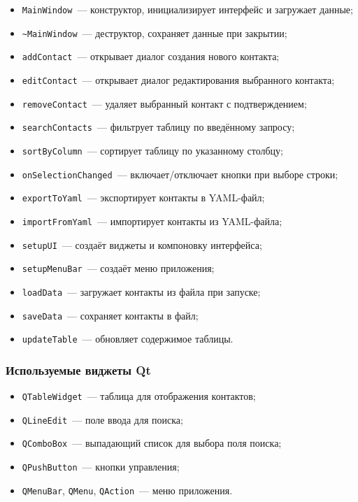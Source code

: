 \begin{itemize}
    \item \texttt{MainWindow}~--- конструктор, инициализирует интерфейс и загружает данные;
    \item \texttt{\textasciitilde MainWindow}~--- деструктор, сохраняет данные при закрытии;
    \item \texttt{addContact}~--- открывает диалог создания нового контакта;
    \item \texttt{editContact}~--- открывает диалог редактирования выбранного контакта;
    \item \texttt{removeContact}~--- удаляет выбранный контакт с подтверждением;
    \item \texttt{searchContacts}~--- фильтрует таблицу по введённому запросу;
    \item \texttt{sortByColumn}~--- сортирует таблицу по указанному столбцу;
    \item \texttt{onSelectionChanged}~--- включает/отключает кнопки при выборе строки;
    \item \texttt{exportToYaml}~--- экспортирует контакты в YAML-файл;
    \item \texttt{importFromYaml}~--- импортирует контакты из YAML-файла;
    \item \texttt{setupUI}~--- создаёт виджеты и компоновку интерфейса;
    \item \texttt{setupMenuBar}~--- создаёт меню приложения;
    \item \texttt{loadData}~--- загружает контакты из файла при запуске;
    \item \texttt{saveData}~--- сохраняет контакты в файл;
    \item \texttt{updateTable}~--- обновляет содержимое таблицы.
\end{itemize}

\subsubsection*{Используемые виджеты Qt}

\begin{itemize}
    \item \texttt{QTableWidget}~--- таблица для отображения контактов;
    \item \texttt{QLineEdit}~--- поле ввода для поиска;
    \item \texttt{QComboBox}~--- выпадающий список для выбора поля поиска;
    \item \texttt{QPushButton}~--- кнопки управления;
    \item \texttt{QMenuBar}, \texttt{QMenu}, \texttt{QAction}~--- меню приложения.
\end{itemize}

